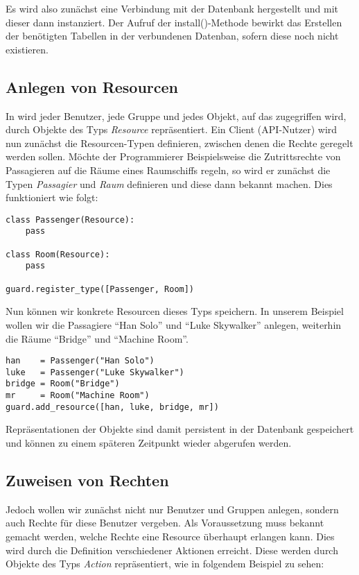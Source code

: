 Es wird also zunächst eine Verbindung mit der Datenbank hergestellt und mit 
dieser dann \product instanziert. Der Aufruf der install()-Methode bewirkt 
das Erstellen der benötigten Tabellen in der verbundenen Datenban, sofern 
diese noch nicht existieren.


\subsection{\label{intro:resources}Anlegen von Resourcen}

In \product wird jeder Benutzer, jede Gruppe und jedes Objekt, auf das 
zugegriffen wird, durch Objekte des Typs {\it Resource} repräsentiert.
Ein Client (API-Nutzer) wird nun zunächst die Resourcen-Typen definieren, 
zwischen denen die Rechte geregelt werden sollen. Möchte der Programmierer 
Beispielsweise die Zutrittsrechte von Passagieren auf die Räume eines 
Raumschiffs regeln, so wird er zunächst die Typen {\it Passagier} und 
{\it Raum} definieren und diese dann \product bekannt machen. Dies 
funktioniert wie folgt:

\begin{lstlisting}
class Passenger(Resource):
    pass

class Room(Resource):
    pass

guard.register_type([Passenger, Room])
\end{lstlisting}

Nun können wir konkrete Resourcen dieses Typs speichern. In unserem Beispiel 
wollen wir die Passagiere ``Han Solo'' und ``Luke Skywalker'' anlegen, 
weiterhin die Räume ``Bridge'' und ``Machine Room''.

\begin{lstlisting}
han    = Passenger("Han Solo")
luke   = Passenger("Luke Skywalker")
bridge = Room("Bridge")
mr     = Room("Machine Room")
guard.add_resource([han, luke, bridge, mr])
\end{lstlisting}

Repräsentationen der Objekte sind damit persistent in der Datenbank 
gespeichert und können zu einem späteren Zeitpunkt wieder abgerufen werden.


\subsection{Zuweisen von Rechten}

Jedoch wollen wir zunächst nicht nur Benutzer und Gruppen anlegen, sondern 
auch Rechte für diese Benutzer vergeben.
Als Voraussetzung muss \product bekannt gemacht werden, welche Rechte 
eine Resource überhaupt erlangen kann. Dies wird durch die Definition 
verschiedener Aktionen erreicht. Diese werden durch Objekte des Typs 
{\it Action} repräsentiert, wie in folgendem Beispiel zu sehen:

